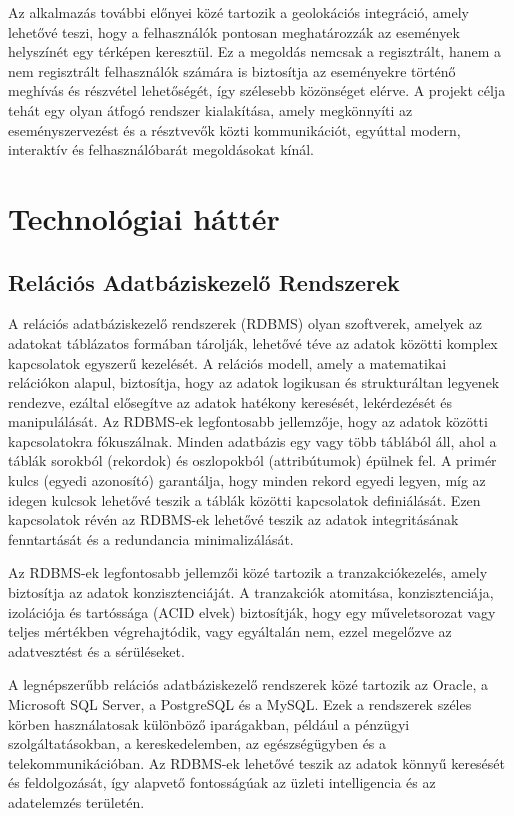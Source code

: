 \documentclass[colorlinks]{thesis-kando}
\theoremstyle{definition}
\theoremstyle{remark}
\begin{document}
  Az alkalmazás további előnyei közé tartozik a geolokációs integráció, amely lehetővé teszi, hogy a felhasználók pontosan meghatározzák az események helyszínét egy térképen keresztül. Ez a megoldás nemcsak a regisztrált, hanem a nem regisztrált felhasználók számára is biztosítja az eseményekre történő meghívás és részvétel lehetőségét, így szélesebb közönséget elérve. A projekt célja tehát egy olyan átfogó rendszer kialakítása, amely megkönnyíti az eseményszervezést és a résztvevők közti kommunikációt, egyúttal modern, interaktív és felhasználóbarát megoldásokat kínál.


\chapter{Technológiai háttér}

\section{Relációs Adatbáziskezelő Rendszerek}

A relációs adatbáziskezelő rendszerek (RDBMS) olyan szoftverek, amelyek az adatokat táblázatos formában tárolják, lehetővé téve az adatok közötti komplex kapcsolatok egyszerű kezelését. A relációs modell, amely a matematikai relációkon alapul, biztosítja, hogy az adatok logikusan és strukturáltan legyenek rendezve, ezáltal elősegítve az adatok hatékony keresését, lekérdezését és manipulálását.
\cite{relacio1}
Az RDBMS-ek legfontosabb jellemzője, hogy az adatok közötti kapcsolatokra fókuszálnak. Minden adatbázis egy vagy több táblából áll, ahol a táblák sorokból (rekordok) és oszlopokból (attribútumok) épülnek fel. A primér kulcs (egyedi azonosító) garantálja, hogy minden rekord egyedi legyen, míg az idegen kulcsok lehetővé teszik a táblák közötti kapcsolatok definiálását. Ezen kapcsolatok révén az RDBMS-ek lehetővé teszik az adatok integritásának fenntartását és a redundancia minimalizálását.

Az RDBMS-ek legfontosabb jellemzői közé tartozik a tranzakciókezelés, amely biztosítja az adatok konzisztenciáját. A tranzakciók atomitása, konzisztenciája, izolációja és tartóssága (ACID elvek) biztosítják, hogy egy műveletsorozat vagy teljes mértékben végrehajtódik, vagy egyáltalán nem, ezzel megelőzve az adatvesztést és a sérüléseket.

A legnépszerűbb relációs adatbáziskezelő rendszerek közé tartozik az Oracle, a Microsoft SQL Server, a PostgreSQL és a MySQL. Ezek a rendszerek széles körben használatosak különböző iparágakban, például a pénzügyi szolgáltatásokban, a kereskedelemben, az egészségügyben és a telekommunikációban. Az RDBMS-ek lehetővé teszik az adatok könnyű keresését és feldolgozását, így alapvető fontosságúak az üzleti intelligencia és az adatelemzés területén.
\end{document}
